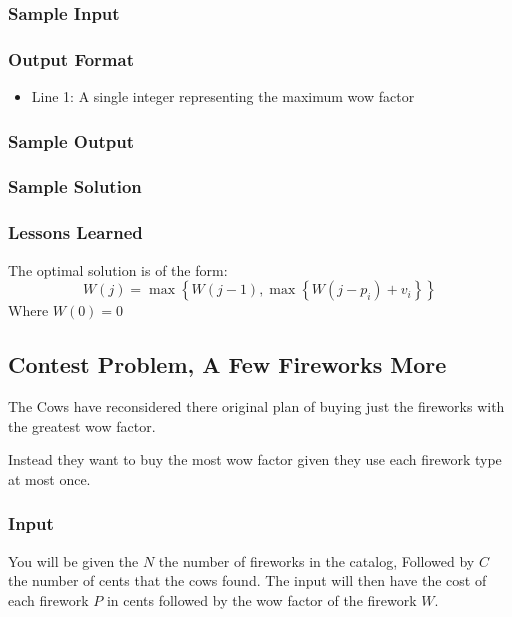 \subsubsection{Sample Input}


\subsubsection{Output Format}
\begin{itemize}
	\item Line 1: A single integer representing the maximum wow factor
\end{itemize}
\subsubsection{Sample Output}


\subsubsection{Sample Solution}


\subsubsection{Lessons Learned}
The optimal solution is of the form:
$$W(j) = \max \left\{W(j-1), \max \left\{W(j - p_i) + v_i \right\}\right\}$$
Where $W(0) = 0$

\subsection{Contest Problem, A Few Fireworks More}
The Cows have reconsidered there original plan of buying just the fireworks with the greatest wow factor.

Instead they want to buy the most wow factor given they use each firework type at most once.

\subsubsection{Input}
You will be given the $N$ the number of fireworks in the catalog,
Followed by $C$ the number of cents that the cows found.
The input will then have the cost of each firework $P$ in cents followed by the wow factor of the firework $W$.

